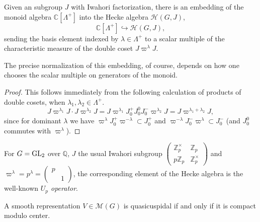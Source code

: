 \begin{proposition}
	\label{proposition-Hecke-subalgebra}
Given an subgroup $J$ with Iwahori factorization, there is an embedding of the monoid algebra $\mathbb C[\Lambda^+]$ into the Hecke algebra $\mathcal H(G,J)$, 
\begin{equation}
	\label{equation-Hecke-subalgebra}
	\mathbb C[\Lambda^+]\hookrightarrow \mathcal H(G,J),
\end{equation}
sending the basis element indexed by $\lambda\in \Lambda^+$ to a scalar multiple of the characteristic measure of the double coset $J\varpi^\lambda J$.
\end{proposition}

The precise normalization of this embedding, of course, depends on how one chooses the scalar multiple on generators of the monoid.

\begin{proof}
	This follows immediately from the following calculation of products of double cosets, when $\lambda_1,\lambda_2\in \Lambda^+$.
	$$ J\varpi^{\lambda_1}J \cdot J\varpi^{\lambda_2}J = J\varpi^{\lambda_1}J_0^+ J_0^0  J_0^- \varpi^{\lambda_2}J = J\varpi^{\lambda_1+\lambda_2}J,$$
	since for dominant $\lambda$ we have $\varpi^\lambda J_0^+ \varpi^{-\lambda} \subset J_0^+$ and $\varpi^{-\lambda} J_0^- \varpi^{\lambda} \subset J_0^-$ (and $J_0^0 $ commutes with $\varpi^\lambda$).
\end{proof}

\begin{remark}
	\label{remark-Up-operator}
   For $G=\rm{GL}_2$ over $\mathbb Q$, $J$ the usual Iwahori subgroup $\begin{pmatrix} \mathbb Z_p^\times & \mathbb Z_p \\ p\mathbb Z_p & \mathbb Z_p^\times\end{pmatrix}$ and $\varpi^\lambda = p^\lambda = \begin{pmatrix} p \\ & 1 \end{pmatrix}$, the corresponding element of the Hecke algebra is the well-known {\it $U_p$ operator}.
\end{remark}


\begin{theorem}
	\label{theorem-compact-cuspidal}
 A smooth representation $V\in \mathcal M(G)$ is quasicuspidal if and only if it is compact modulo center. 
\end{theorem}

